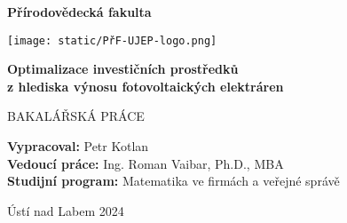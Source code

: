 \begin{titlepage}
    \begin{center}
        \Huge

        \textbf{\textsf{}}
            
        \vspace{1cm}
        \LARGE
        \textbf{\textsf{Přírodovědecká fakulta}}
        
        \vspace{2cm}
        \texttt{[image: static/PřF-UJEP-logo.png]}
        \vspace{3cm}
            
        \textbf{\textsf{Optimalizace investičních prostředků \\z hlediska výnosu fotovoltaických elektráren}}
        
        \vspace{1cm}

        \large
        BAKALÁŘSKÁ PRÁCE

        \vfill

            \begin{flushleft}
                
            \large
            \textbf{Vypracoval:} Petr Kotlan \\
            \vspace{0.3cm}
            \textbf{Vedoucí práce:} Ing. Roman Vaibar, Ph.D., MBA \\
            \vspace{1.5cm}
            \textbf{Studijní program:} Matematika ve firmách a veřejné správě
        \end{flushleft}

        \vspace{1.5cm}
        
        \LARGE
        Ústí nad Labem 2024

    \end{center}
\end{titlepage}
